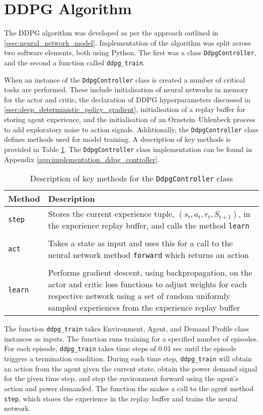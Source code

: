 \section{DDPG Algorithm}
The DDPG algorithm was developed as per the approach outlined in \textsection \ref{ssec:neural_network_model}. Implementation of the algorithm was split across two software elements, both using Python. The first was a class \verb|DdpgController|, and the second a function called \verb|ddpg_train|.

When an instance of the \verb|DdpgController| class is created a number of critical tasks are performed. These include initialisation of neural networks in memory for the actor and critic, the declaration of DDPG hyperparameters discussed in \textsection \ref{ssec:deep_deterministic_policy_gradient}, initialisation of a replay buffer for storing agent experience, and the initialisation of an Ornstein–Uhlenbeck process to add exploratory noise to action signals. Additionally, the \verb|DdpgController| class defines methods used for model training. A description of key methods is provided in Table \ref{tab:4103}. The \verb|DdpgController| class implementation can be found in Appendix \ref{app:implementation_ddpg_controller}.

\begin{table}[h]
	\centering
	\cprotect\caption{Description of key methods for the \verb|DdpgController| class}
	\begin{tabular}{lp{12cm}}
		\toprule
		\textbf{Method} & \textbf{Description} \\
		\midrule
		\verb|step| & Stores the current experience tuple, $(s_t, a_t, r_t, S_{t+1})$, in the experience replay buffer, and calls the method \verb|learn|\\
		 & \\
		\verb|act| & Takes a state as input and uses this for a call to the neural network method \verb|forward| which returns an action\\
		 & \\
		\verb|learn| & Performs gradient descent, using backpropagation, on the actor and critic loss functions to adjust weights for each respective network using a set of random uniformly sampled experiences from the experience replay buffer\\
		\bottomrule
	\end{tabular}\label{tab:4103}
\end{table}

The function \verb|ddpg_train| takes Environment, Agent, and Demand Profile class instances as inputs. The function runs training for a specified number of episodes. For each episode, \verb|ddpg_train| takes time steps of 0.01 sec until the episode triggers a termination condition. During each time step, \verb|ddpg_train| will obtain an action from the agent given the current state, obtain the power demand signal for the given time step, and step the environment forward using the agent's action and power demanded. The function the makes a call to the agent method \verb|step|, which stores the experience in the replay buffer and trains the neural network.